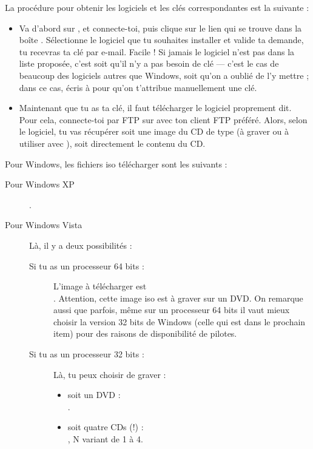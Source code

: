 La procédure pour obtenir les logiciels et les clés correspondantes
est la suivante :
\begin{itemize}

\item Va d'abord sur \fkz, et connecte-toi, puis clique sur le lien  qui se trouve dans la bo\^ite . Sélectionne le logiciel que tu souhaites installer et valide ta demande, tu recevras ta clé par e-mail. Facile ! Si jamais le logiciel n'est pas dans la liste proposée, c'est soit qu'il n'y a pas besoin de clé --- c'est le cas de beaucoup des logiciels autres que Windows, soit qu'on a oublié de l'y mettre ; dans ce cas, écris à  pour qu'on t'attribue manuellement une clé.

\item Maintenant que tu as ta clé, il faut télécharger le logiciel proprement
dit. Pour cela, connecte-toi par FTP sur  avec ton client FTP préféré.
Alors, selon le logiciel, tu vas récupérer soit une image du CD de type  (à
graver ou à utiliser avec ), soit directement le contenu du CD.
\end{itemize}

Pour Windows, les fichiers iso télécharger sont les suivants :
\begin{description}
\item[Pour Windows XP]
.

\item[Pour Windows Vista]
Là, il y a deux possibilités :
\begin{description}
\item[Si tu as un processeur 64 bits :] L'image à télécharger est \\
. Attention, cette
image iso est à graver sur un DVD. On remarque aussi que parfois, même sur un processeur 64 bits il
vaut mieux choisir la version 32 bits de Windows (celle qui est dans le prochain item) pour des
raisons de disponibilité de pilotes.
\item[Si tu as un processeur 32 bits :] Là, tu peux choisir de graver :
\begin{itemize}
\item soit un DVD : \\
.
\item soit quatre CDs (!) : \\
, N variant
de 1 à 4.

\end{itemize}
\end{description}

\end{description}


